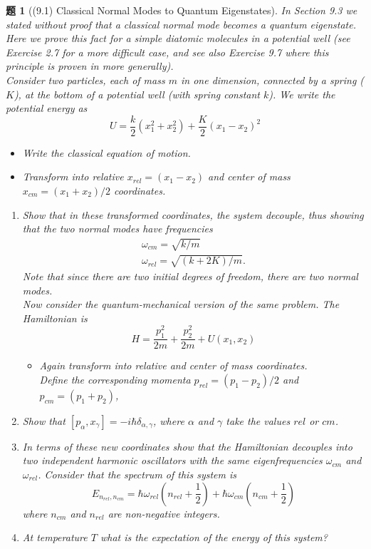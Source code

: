 \documentclass[UTF8,10pt,a4paper]{article}
\theoremstyle{Problem}
\newtheorem{prob}{题}
\theoremstyle{Solution}
\begin{document}
\begin{prob}[(9.1) Classical Normal Modes to Quantum Eigenstates]
    In Section 9.3 we stated without proof that a classical normal mode becomes a quantum eigenstate. Here we prove this fact for a simple diatomic molecules in a potential well (see Exercise 2.7 for a more difficult case, and see also Exercise 9.7 where this principle is proven in more generally).\\
    Consider two particles, each of mass $m$ in one dimension, connected by a spring ($K$), at the bottom of a potential well (with spring constant $k$). We write the potential energy as
    \[
        U=\frac{k}{2}(x_1^2+x_2^2)+\frac{K}{2}(x_1-x_2)^2
    \]
    \begin{itemize}
        \item[$\triangleright$] Write the classical equation of motion.
        \item[$\triangleright$] Transform into relative $x_{rel}=(x_1-x_2)$ and center of mass $x_{cm}=(x_1+x_2)/2$ coordinates.
    \end{itemize}
    \begin{enumerate}
        \item[(a)] Show that in these transformed coordinates, the system decouple, thus showing that the two normal modes have frequencies
        \begin{gather*}
            \omega_{cm}=\sqrt{k/m}\\
            \omega_{rel}=\sqrt{(k+2K)/m}.
        \end{gather*}
        Note that since there are two initial degrees of freedom, there are two normal modes.\\
        Now consider the quantum-mechanical version of the same problem. The Hamiltonian is
        \[
            H=\frac{p_1^2}{2m}+\frac{p_2^2}{2m}+U(x_1,x_2)
        \]
        \begin{itemize}
            \item[$\triangleright$] Again transform into relative and center of mass coordinates.\\
            Define the corresponding momenta $p_{rel}=(p_1-p_2)/2$ and $p_{cm}=(p_1+p_2)$,
        \end{itemize}
        \item[(b)] Show that $[p_{\alpha},x_{\gamma}]=-i\hbar\delta_{\alpha,\gamma}$, where $\alpha$ and $\gamma$ take the values $rel$ or $cm$.
        \item[(c)] In terms of these new coordinates show that the Hamiltonian decouples into two independent harmonic oscillators with the same eigenfrequencies $\omega_{cm}$ and $\omega_{rel}$. Consider that the spectrum of this system is
        \[
            E_{n_{rel},n_{cm}}=\hbar\omega_{rel}(n_{rel}+\frac{1}{2})+\hbar\omega_{cm}(n_{cm}+\frac{1}{2})
        \]
        where $n_{cm}$ and $n_{rel}$ are non-negative integers.
        \item[(d)] At temperature $T$ what is the expectation of the energy of this system?
    \end{enumerate}
\end{prob}
\end{document}
